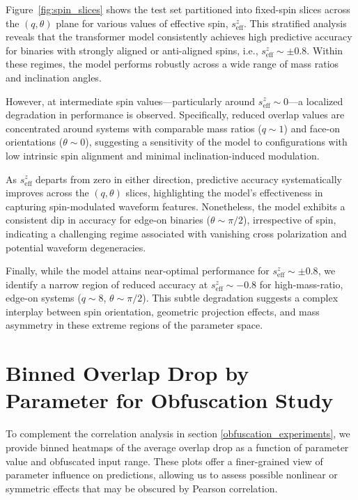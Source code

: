 \documentclass[12pt]{iopart}
\begin{document}
Figure~\ref{fig:spin_slices} shows the test set partitioned into 
fixed-spin slices across the $(q, \theta)$ plane for various 
values of effective spin, $s_{\mathrm{eff}}^z$. This 
stratified analysis reveals that the transformer model 
consistently achieves high predictive accuracy for binaries 
with strongly aligned or anti-aligned spins, 
i.e., $s_{\mathrm{eff}}^z \sim \pm 0.8$. Within these regimes, 
the model performs robustly across a wide range of mass ratios 
and inclination angles.

However, at intermediate spin values—particularly around 
$s_{\mathrm{eff}}^z \sim 0$—a localized degradation 
in performance is observed. Specifically, reduced overlap 
values are concentrated around systems with comparable mass 
ratios ($q \sim 1$) and face-on orientations ($\theta \sim 0$), 
suggesting a sensitivity of the model to configurations with 
low intrinsic spin alignment and minimal inclination-induced 
modulation.


As $s_{\mathrm{eff}}^z$ departs from zero in either 
direction, predictive accuracy systematically improves across 
the $(q, \theta)$ slices, highlighting the model's effectiveness 
in capturing spin-modulated waveform features. Nonetheless, the 
model exhibits a consistent dip in accuracy for edge-on 
binaries ($\theta \sim \pi/2$), irrespective of spin, indicating 
a challenging regime associated with vanishing cross polarization 
and potential waveform degeneracies.


Finally, while the model attains near-optimal performance 
for $s_{\mathrm{eff}}^z \sim \pm 0.8$, we identify a narrow 
region of reduced accuracy at $s_{\mathrm{eff}}^z \sim -0.8$ 
for high-mass-ratio, edge-on systems ($q \sim 8$, $\theta \sim 
\pi/2$). This subtle degradation suggests a complex interplay 
between spin orientation, geometric projection effects, and 
mass asymmetry in these extreme regions of the parameter space.


\section{Binned Overlap Drop by Parameter for Obfuscation Study}
\label{appendix:drop_bins} 

To complement the correlation analysis in section \ref{obfuscation_experiments}, we provide binned heatmaps of the average overlap drop as a function of parameter value and obfuscated input range. These plots offer a finer-grained view of parameter influence on predictions, allowing us to assess possible nonlinear or symmetric effects that may be obscured by Pearson correlation.
\end{document}
